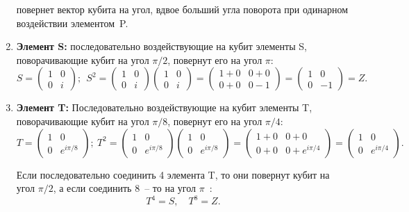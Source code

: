 \documentclass[pscyr,notitlepage]{hedwork}
\renewcommand{\~}[1]{\widetilde{#1}}
\begin{document}
\begin{enumerate}
      повернет вектор кубита на угол, вдвое больший угла поворота при одинарном
      воздействии элементом~P.
    \item \textbf{Элемент S:}
      последовательно воздействующие на кубит элементы S, поворачивающие кубит
      на угол \( \pi/ 2 \), повернут его на угол \( \pi \):
      \[
        S =
        \begin{pmatrix}
          1 & 0 \\[-1.7ex] 0 & i
        \end{pmatrix}\!\!;
        \ \
        S^2\! = 
        \begin{pmatrix}
          1 & 0 \\[-1.7ex] 0 & i
        \end{pmatrix}\!\!
        \begin{pmatrix}
          1 & 0 \\[-1.7ex] 0 & i
        \end{pmatrix} \!=\!
        \begin{pmatrix}
          1 + 0 & 0 + 0 \\[-1.7ex] 0 + 0 & 0 - 1
        \end{pmatrix} \!=\!
        \begin{pmatrix}
          1 & 0 \\[-1.7ex] 0 & -1
        \end{pmatrix}\!\! =\! Z.
      \]
    \item \textbf{Элемент T:}
      Последовательно воздействующие на кубит элементы T, поворачивающие кубит
      на угол \( \pi / 8 \), повернут его на угол \( \pi / 4 \):
      \[
        T =
        \begin{pmatrix}
          1 & 0 \\[-1.7ex] 0 & e^{i\pi/8}
        \end{pmatrix}\!\!;
        \
        T^2 \!=\!
        \begin{pmatrix}
          1 & 0 \\[-1.7ex] 0 & e^{i\pi/8}
        \end{pmatrix}\!\!
        \begin{pmatrix}
          1 & 0 \\[-1.7ex] 0 & e^{i\pi/8}
        \end{pmatrix} \!=\!
        \begin{pmatrix}
          1 + 0 & 0 + 0 \\[-1.7ex] 0 + 0 & 0 + e^{i\pi/4}
        \end{pmatrix} \!=\!
        \begin{pmatrix}
          1 & 0 \\[-1.7ex] 0 & e^{i\pi/4}
        \end{pmatrix}.
      \]
      
      Если последовательно соединить 4 элемента T, то они повернут кубит на
      угол \( \pi / 2 \), а если соединить 8~-- то на угол
      \( \pi \)~\cite{main,task}:
      \[
        T^4 = S, \quad T^8 = Z.
      \]
  \end{enumerate}
  
\end{document}
